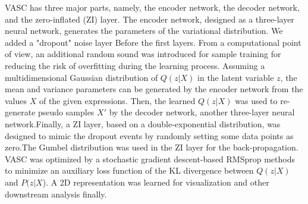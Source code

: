 \documentclass[12 pts]{article}
\begin{document}
VASC has three major parts, namely, the encoder network, the decoder network, and the zero-inflated (ZI) layer. The encoder network, designed as a three-layer neural network, generates the parameters of the variational distribution. We added a "dropout" noise layer Before the first layers. From a computational point of view, an additional random sound was introduced for sample training for reducing the risk of overfitting during the learning process. 
Assuming a multidimensional Gaussian distribution of $Q(z|X)$ in the latent variable $z$, the mean and variance parameters can be generated by the encoder network from the values $X$ of the given expressions. Then, the learned $Q(z|X)$ was used to re-generate pseudo samples $X'$ by the decoder network, another three-layer neural network.Finally, a ZI layer, based on a double-exponential distribution, was designed to mimic the dropout events by randomly setting some data points as zero.The Gumbel distribution was used in the ZI layer for the back-propagation. VASC was optimized by a stochastic gradient descent-based RMSprop methods to minimize an auxiliary loss function of the KL divergence between $Q(z|X)$ and $P(z|X$). A 2D representation was learned for visualization and other downstream analysis finally.
\end{document}
